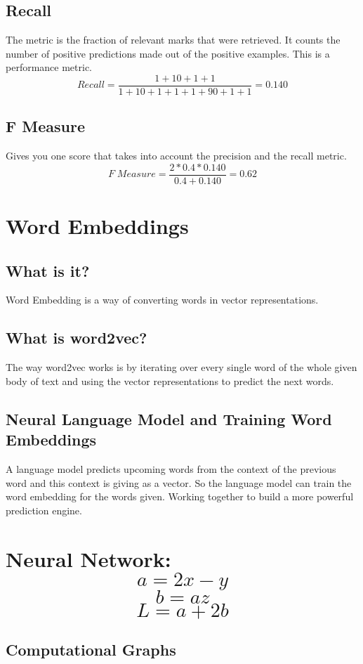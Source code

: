 \documentclass{article}
\begin{document}
\subsection{Recall}
The metric is the fraction of relevant marks that were retrieved. It counts the number of positive predictions made out of the positive examples.
This is a performance metric. 
\begin{equation}
	Recall=\frac{1+10+1+1}{1+10+1+1+ 1 + 90 + 1 +1}=0.140
\end{equation}
\subsection{F Measure}
Gives you one score that takes into account the precision and the recall metric.
\begin{equation}
	F\;Measure=\frac{2 * 0.4 * 0.140}{0.4 + 0.140}=0.62
\end{equation}
\section{Word Embeddings} 
\subsection{What is it?}
Word Embedding is a way of converting words in vector representations.
\subsection{What is word2vec?}
The way word2vec works is by iterating over every single word of the whole given body of text and using the vector representations to predict the next words.
\subsection{Neural Language Model and Training Word Embeddings}
A language model predicts upcoming words from the context of the previous word and this context is giving as a vector. 
So the language model can train the word embedding for the words given. Working together to build a more powerful prediction engine. 
\section{Neural Network: \[a = 2x - y\] \[b = az\] \[L = a + 2b\]
}
\subsection{Computational Graphs}
\end{document}
